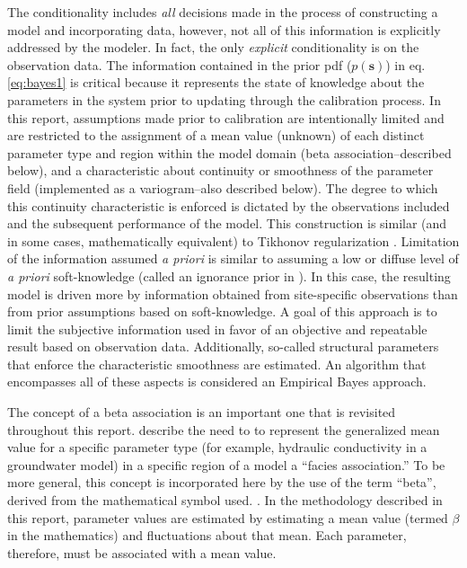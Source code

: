 \documentclass[11pt,oneside,onecolumn]{usgsreport}
\begin{document}
\begin{multicols}{2}
The conditionality includes \emph{all }decisions made in the process
of constructing a model and incorporating data, however, not all of
this information is explicitly addressed by the modeler. In fact,
the only \emph{explicit }conditionality is on the observation data.
The information contained in the prior pdf ($p\left(\mathbf{s}\right)$)
in eq. \ref{eq:bayes1} is critical because it represents the state
of knowledge about the parameters in the system prior to updating
through the calibration process. In this report, assumptions made
prior to calibration are intentionally limited and are restricted
to the assignment of a mean value (unknown) of each distinct parameter
type and region within the model domain (beta association--described
below), and a characteristic about continuity or smoothness of the
parameter field (implemented as a variogram--also described below).
The degree to which this continuity characteristic is enforced is
dictated by the observations included and the subsequent performance
of the model. This construction is similar (and in some cases, mathematically
equivalent) to Tikhonov regularization \citep{Tikhonov1963a,Tikhonov1963b,AsterEtal2005}.
Limitation of the information assumed \emph{a priori }is similar to
assuming a low or diffuse level of \emph{a priori }soft-knowledge
(called an ignorance prior in \citealt[chapter 12]{jaynesBook}).
In this case, the resulting model is driven more by information obtained
from site-specific observations than from prior assumptions based
on soft-knowledge. A goal of this approach is to limit the subjective
information used in favor of an objective and repeatable result based
on observation data. Additionally, so-called structural parameters
that enforce the characteristic smoothness are estimated. An algorithm
that encompasses all of these aspects is considered an Empirical Bayes
approach.

The concept of a beta association is an important one that is revisited
throughout this report. \citet{fienenIsthmusWRR} describe the need
to to represent the generalized mean value for a specific parameter
type (for example, hydraulic conductivity in a groundwater model)
in a specific region of a model a ``facies association.'' To be more
general, this concept is incorporated here by the use of the term
``beta'', derived from the mathematical symbol used. . In the methodology
described in this report, parameter values are estimated by estimating
a mean value (termed $\beta$ in the mathematics) and fluctuations
about that mean. Each parameter, therefore, must be associated with
a mean value.


\end{multicols}
\end{document}
